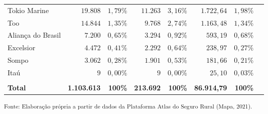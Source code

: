 \begin{tabularx}{\textwidth}{lRRRRRRR}
    Tokio Marine      &  $19.808$       &  $1,79\%$                 &  $11.263$                    &  $3,16\%$             &  $1.722,64$        &  $1,98\%$               \\
    Too               &  $14.844$       &  $1,35\%$                 &  $9.768$                     &  $2,74\%$             &  $1.163,48$        &  $1,34\%$               \\
    Aliança do Brasil &  $7.200$        &  $0,65\%$                 &  $3.294$                     &  $0,92\%$             &  $593,19$          &  $0,68\%$               \\
    Excelsior         &  $4.472$        &  $0,41\%$                 &  $2.292$                     &  $0,64\%$             &  $238,97$          &  $0,27\%$               \\
    Sompo             &  $3.062$        &  $0,28\%$                 &  $1.901$                     &  $0,53\%$             &  $181,66$          &  $0,21\%$               \\
    Itaú              &  $9$            &  $0,00\%$                 &  $9$                         &  $0,00\%$             &  $25,10$           &  $0,03\%$               \\
    \hline \\[-1.9ex]
    \textbf{Total}    & \textbf{1.103.613} & \textbf{100\%}         & \textbf{213.692}             & \textbf{100\%}        & \textbf{86.914,79} & \textbf{100\%}\\
	\hline 
\end{tabularx}
\small \textsuperscript{Fonte: Elaboração própria a partir de dados da Plataforma Atlas do Seguro Rural (Mapa, 2021).  }\\
